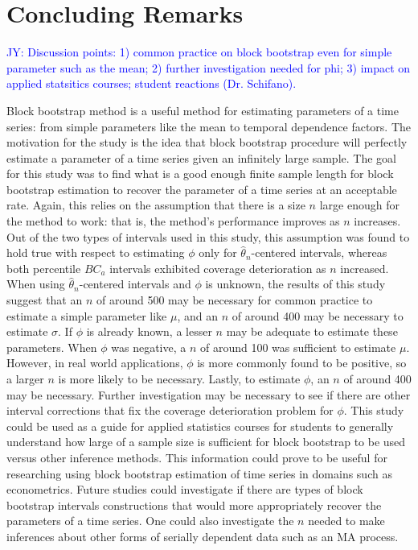 \documentclass[12pt, letterpaper, titlepage]{article}
\newcommand{\jy}[1]{\textcolor{blue}{JY: #1}}
\begin{document}
\section{Concluding Remarks}
\label{sec:conremarks}

\jy{Discussion points:
  1) common practice on block bootstrap even for simple parameter such as the
  mean;
  2) further investigation needed for phi;
  3) impact on applied statsitics courses; student reactions (Dr. Schifano).
}


Block bootstrap method is a useful method for estimating parameters of a time
series: from simple parameters like the mean to temporal dependence factors.
The motivation for the study is the idea that block bootstrap procedure will
perfectly estimate a parameter of a time series given an infinitely large
sample. The goal for this study was to find what is a good enough finite
sample length for block bootstrap estimation to recover the parameter of a
time series at an acceptable rate. Again, this relies on the assumption that
there is a size $n$ large enough for the method to work: that is, the method's
performance improves as $n$ increases. Out of the two types of intervals used
in this study, this assumption was found to hold true with respect to
estimating $\phi$ only for $\hat{\theta}_{n}$-centered intervals, whereas both
percentile $BC_a$ intervals exhibited coverage deterioration as $n$
increased. When using $\hat{\theta}_{n}$-centered intervals and $\phi$ is
unknown, the results of this study suggest that an $n$ of around 500 may be
necessary for common practice to estimate a simple parameter like $\mu$, and
an $n$ of around 400 may be necessary to
estimate $\sigma$. If $\phi$ is already known, a lesser $n$ may be adequate to
estimate these parameters. When $\phi$ was negative, a $n$ of around 100 was
sufficient to estimate $\mu$. However, in real world applications, $\phi$ is
more commonly found to be positive, so a larger $n$ is more likely to be
necessary. Lastly, to estimate $\phi$, an $n$ of around 400 may be necessary.
Further investigation may be necessary to see if there are other interval
corrections that fix the coverage deterioration problem for $\phi$.
This study could be used as a guide for applied statistics courses for students
to generally understand how large of a sample size is sufficient for block
bootstrap to be used versus other inference methods.
This information could prove to be useful for researching using block bootstrap
estimation of time series in domains such as econometrics. Future studies
could investigate if there are types of block bootstrap intervals
constructions that would more appropriately recover the parameters of a time
series. One could also investigate the $n$ needed to make inferences about
other forms of serially dependent data such as an MA process.




\end{document}
